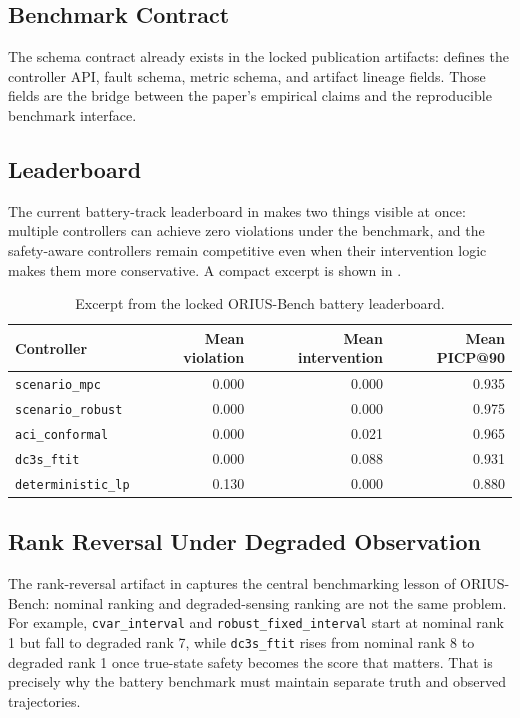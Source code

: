\subsection{Benchmark Contract}

The schema contract already exists in the locked publication artifacts:
 defines the
controller API, fault schema, metric schema, and artifact lineage fields.
Those fields are the bridge between the paper's empirical claims and the
reproducible benchmark interface.

\subsection{Leaderboard}

The current battery-track leaderboard in
 makes two
things visible at once: multiple controllers can achieve zero violations under
the benchmark, and the safety-aware controllers remain competitive even when
their intervention logic makes them more conservative.  A compact excerpt is
shown in .

\begin{table}[htbp]
\centering\small
\caption{Excerpt from the locked ORIUS-Bench battery leaderboard.}
\label{tab:orius_bench_excerpt}
\begin{tabular}{lrrr}
\toprule
Controller & Mean violation & Mean intervention & Mean PICP@90 \\
\midrule
\texttt{scenario\_mpc} & 0.000 & 0.000 & 0.935 \\
\texttt{scenario\_robust} & 0.000 & 0.000 & 0.975 \\
\texttt{aci\_conformal} & 0.000 & 0.021 & 0.965 \\
\texttt{dc3s\_ftit} & 0.000 & 0.088 & 0.931 \\
\texttt{deterministic\_lp} & 0.130 & 0.000 & 0.880 \\
\bottomrule
\end{tabular}
\end{table}

\subsection{Rank Reversal Under Degraded Observation}

The rank-reversal artifact in
 captures the central
benchmarking lesson of ORIUS-Bench: nominal ranking and degraded-sensing
ranking are not the same problem.  For example, \texttt{cvar\_interval} and
\texttt{robust\_fixed\_interval} start at nominal rank 1 but fall to degraded
rank 7, while \texttt{dc3s\_ftit} rises from nominal rank 8 to degraded rank
1 once true-state safety becomes the score that matters.  That is precisely
why the battery benchmark must maintain separate truth and observed
trajectories.

